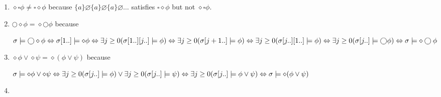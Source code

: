 \documentclass[12pt, a4paper]{article}
\begin{document}
\section{} %
\begin{enumerate}[a]
	\item %
	$\diamond \square \phi \neq \square \diamond \phi$ because $\{a\} \varnothing \{a\} \varnothing \{a\} \varnothing \dots$ satisfies $\square \diamond \phi$ but not $\diamond \square \phi$.
	\item %
	$\bigcirc \diamond \phi = \diamond \bigcirc \phi$ because

	$\sigma \models \bigcirc \diamond \phi\\
	\Leftrightarrow \sigma[1..] \models \diamond \phi\\
	\Leftrightarrow \exists j \geq 0 (\sigma[1..][j..] \models \phi)\\
	\Leftrightarrow \exists j \geq 0 (\sigma[j+1..] \models \phi)\\
	\Leftrightarrow \exists j \geq 0 (\sigma[j..][1..] \models \phi)\\
	\Leftrightarrow \exists j \geq 0 (\sigma[j..] \models \bigcirc \phi)\\
	\Leftrightarrow \sigma \models \diamond \bigcirc \phi$
	\item %
	$\diamond \phi \lor \diamond \psi = \diamond (\phi \lor \psi)$ because

	$\sigma \models \diamond \phi \lor \diamond \psi\\
	\Leftrightarrow \exists j \geq 0 (\sigma[j..] \models \phi) \lor \exists j \geq 0 (\sigma[j..] \models \psi)\\
	\Leftrightarrow \exists j \geq 0 (\sigma[j..] \models \phi \lor \psi)\\
	\Leftrightarrow \sigma \models \diamond (\phi \lor \psi)$
	\item %
\end{enumerate}
\end{document}

